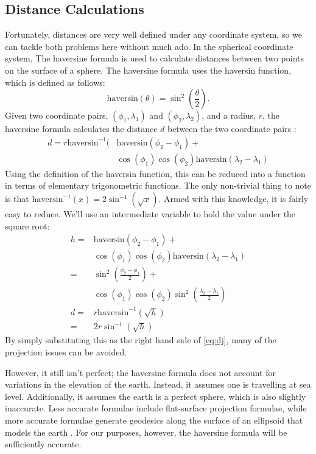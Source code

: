 \documentclass[twocolumn,12pt]{article}
\begin{document}
\subsection{Distance Calculations}
Fortunately, distances are very well defined under any coordinate system, so we
can tackle both problems here without much ado. In the spherical coordinate
system, The haversine formula is used to calculate distances between two points
on the surface of a sphere. The haversine formula uses the haversin function,
which is defined as follows:
\newcommand{\haversin}{\mbox{haversin}}
\[ \haversin (\theta) = \sin^2(\frac{\theta}{2}). \]
Given two coordinate pairs, $(\phi_1, \lambda_1)$ and $(\phi_2, \lambda_2)$,
and a radius, $r$, the haversine formula calculates the distance $d$ between
the two coordinate pairs :
\begin{align*}
  d = r\haversin^{-1}(&\haversin(\phi_2 - \phi_1) + \\
  & \cos(\phi_1)\cos(\phi_2)\haversin(\lambda_2 -\lambda_1)
\end{align*}
Using the definition of the haversin function, this can be reduced into a
function in terms of elementary trigonometric functions. The only non-trivial
thing to note is that $\haversin^{-1}(x) = 2\sin^{-1}(\sqrt{x})$. Armed with
this knowledge, it is fairly easy to reduce. We'll use an intermediate variable
to hold the value under the square root:
\begin{align*}
  h = & \haversin(\phi_2-\phi_1) + \\
  & \cos(\phi_1)\cos(\phi_2)\haversin(\lambda_2-\lambda_1) \\
  = & \sin^2\left(\frac{\phi_2 - \phi_1}{2}\right) + \\
  & \cos(\phi_1)\cos(\phi_2)\sin^2\left(\frac{\lambda_2-\lambda_1}{2}\right)\\
  d = & r\haversin^{-1}\left(\sqrt{h}\right) \\
  = & 2r\sin^{-1}\left(\sqrt{h}\right)
\end{align*}
By simply substituting this as the right hand side of \eqref{eq:dj}, many of the
projection issues can be avoided.

 However, it still isn't perfect; the haversine
formula does not account for variations in the elevation of the earth. Instead,
it assumes one is travelling at sea level. Additionally, it assumes the earth is
a perfect sphere, which is also slightly inaccurate. Less accurate formulae
include flat-surface projection formulae, while more accurate formulae
generate geodesics along the surface of an ellipsoid that models the earth
. For our purposes, however, the haversine formula will be
sufficiently accurate.
\end{document}
